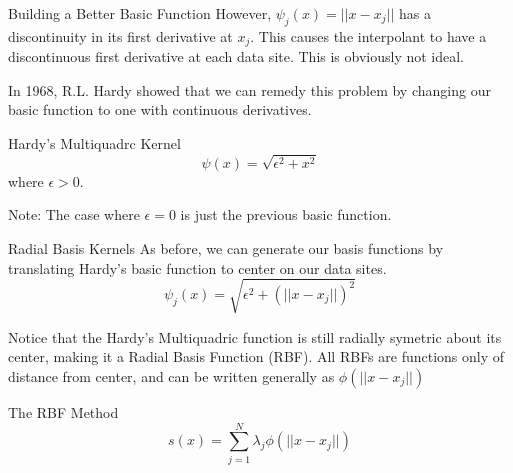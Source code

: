 \documentclass[12pt,t]{beamer}
\newcommand{\subt}[1]{{\footnotesize \color{subtitle} {#1}}}
\begin{document}
\begin{frame}{Building a Better Basic Function}
However, $\psi_j(x)=||x-x_j||$ has a discontinuity in its first derivative at $x_j$. This causes the interpolant to have a discontinuous first derivative at each data site. This is obviously not ideal.
\bigskip

In 1968, R.L. Hardy showed that we can remedy this problem by changing our basic function to one with continuous derivatives.

\subt{Hardy's Multiquadrc Kernel}
\begin{equation*}
\psi(x)=\sqrt{\epsilon^2 + x^2}
\end{equation*}
where $\epsilon > 0$.

\subt{Note:} The case where $\epsilon=0$ is just the previous basic function.

\note{}
\end{frame}

\begin{frame}{Radial Basis Kernels}
As before, we can generate our basis functions by translating Hardy's basic function to center on our data sites.
\begin{equation*}
\psi_j(x)=\sqrt{\epsilon^2 + (||x-x_j||)^2}
\end{equation*}

Notice that the Hardy's Multiquadric function is still radially symetric about its center, making it a Radial Basis Function (RBF). 
All RBFs are functions only of distance from center, and can be written generally as $\phi(||x-x_j||)$

\subt{The RBF Method}
\begin{equation*}
s(x)=\sum_{j=1}^N \lambda_j \phi(||x-x_j||)
\end{equation*}

\note{}
\end{frame}
\end{document}
